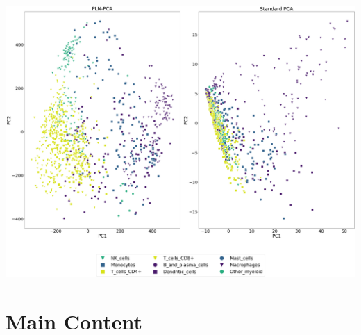 \documentclass{beamer}
\begin{document}
\begin{frame}
    \includegraphics[width = \linewidth]{figures/plnpca_vs_pca_last.png}
\end{frame}

\section{Main Content}
\end{document}
